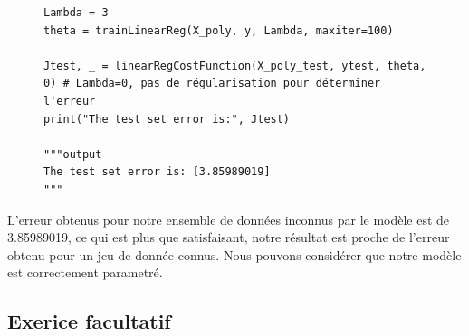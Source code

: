 \begin{figure}[!h]
\begin{verbatim}
Lambda = 3
theta = trainLinearReg(X_poly, y, Lambda, maxiter=100)

Jtest, _ = linearRegCostFunction(X_poly_test, ytest, theta, 0) # Lambda=0, pas de régularisation pour déterminer l'erreur
print("The test set error is:", Jtest)

"""output
The test set error is: [3.85989019]
"""
\end{verbatim}   
\end{figure}

L'erreur obtenus pour notre ensemble de données inconnus par le modèle est de 3.85989019, ce qui est plus que satisfaisant, notre résultat est proche de l'erreur obtenu pour un jeu de donnée connus. Nous pouvons considérer que notre modèle est correctement 
parametré.

\vspace{.5cm}
    
\subsection{Exerice facultatif}

